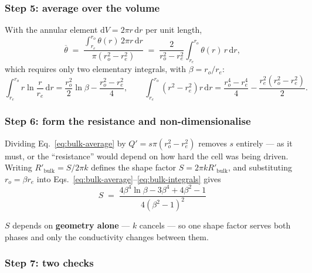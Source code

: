 \subsubsection*{Step 5: average over the volume}

With the annular element $\mathrm{d}V=2\pi r\,\mathrm{d}r$ per unit length,
\begin{equation}
  \overline{\theta} \;=\;
  \frac{\displaystyle\int_{r_{e}}^{r_{o}}\theta(r)\,2\pi r\,\mathrm{d}r}
       {\pi\left(r_{o}^{2}-r_{e}^{2}\right)}
  \;=\; \frac{2}{r_{o}^{2}-r_{e}^{2}}
        \int_{r_{e}}^{r_{o}}\theta(r)\,r\,\mathrm{d}r ,
  \label{eq:bulk-average}
\end{equation}
which requires only two elementary integrals, with $\beta=r_{o}/r_{e}$:
\begin{equation}
  \int_{r_{e}}^{r_{o}}\! r\ln\frac{r}{r_{e}}\,\mathrm{d}r
    = \frac{r_{o}^{2}}{2}\ln\beta-\frac{r_{o}^{2}-r_{e}^{2}}{4},
  \qquad
  \int_{r_{e}}^{r_{o}}\!\left(r^{2}-r_{e}^{2}\right) r\,\mathrm{d}r
    = \frac{r_{o}^{4}-r_{e}^{4}}{4}
      -\frac{r_{e}^{2}\left(r_{o}^{2}-r_{e}^{2}\right)}{2}.
  \label{eq:bulk-integrals}
\end{equation}

\subsubsection*{Step 6: form the resistance and non-dimensionalise}

Dividing Eq.~\eqref{eq:bulk-average} by $Q'=s\pi(r_{o}^{2}-r_{e}^{2})$ removes
$s$ entirely --- as it must, or the ``resistance'' would depend on how hard the
cell was being driven. Writing $R'_{\mathrm{bulk}}=S/2\pi k$ defines the shape
factor $S=2\pi k R'_{\mathrm{bulk}}$, and substituting $r_{o}=\beta r_{e}$ into
Eqs.~\eqref{eq:bulk-average}--\eqref{eq:bulk-integrals} gives
\begin{equation}
  \boxed{\;S \;=\;
  \frac{4\beta^{4}\ln\beta-3\beta^{4}+4\beta^{2}-1}
       {4\left(\beta^{2}-1\right)^{2}}\;}
  \label{eq:shape-factor}
\end{equation}

\noindent
$S$ depends on \textbf{geometry alone} --- $k$ cancels --- so one shape factor
serves both phases and only the conductivity changes between them.

\subsubsection*{Step 7: two checks}

